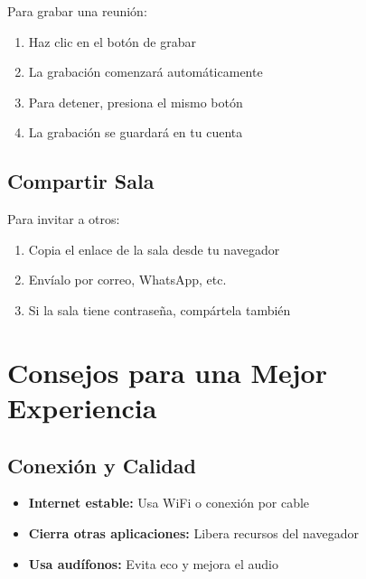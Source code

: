 \documentclass[11pt,a4paper]{article}
\begin{document}
Para grabar una reunión:
\begin{enumerate}[leftmargin=2cm]
    \item Haz clic en el botón de grabar \textcolor{red}{\faCircle}
    \item La grabación comenzará automáticamente
    \item Para detener, presiona el mismo botón
    \item La grabación se guardará en tu cuenta
\end{enumerate}

\subsection{Compartir Sala}

Para invitar a otros:
\begin{enumerate}[leftmargin=2cm]
    \item Copia el enlace de la sala desde tu navegador
    \item Envíalo por correo, WhatsApp, etc.
    \item Si la sala tiene contraseña, compártela también
\end{enumerate}

\begin{center}
\end{center}

\section{Consejos para una Mejor Experiencia \faThumbsUp}

\subsection{Conexión y Calidad}

\begin{itemize}[leftmargin=2cm]
    \item[\color{charlatonCyan}\faWifi] \textbf{Internet estable:} Usa WiFi o conexión por cable
    \item[\color{charlatonBlue}\faDesktop] \textbf{Cierra otras aplicaciones:} Libera recursos del navegador
    \item[\color{charlatonOrange}\faVolumeUp] \textbf{Usa audífonos:} Evita eco y mejora el audio
\end{itemize}
\end{document}
